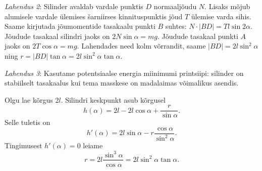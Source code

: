 \textit{Lahendus 2}: Silinder avaldab vardale punktis $D$ normaaljõudu $N$. Lisaks mõjub alumisele vardale ülemises šarniirses kinnituspunktis jõud $T$ ülemise varda sihis. Saame kirjutada jõumomentide tasakaalu punkti $B$ suhtes: $N \cdot |BD| =Tl\sin2\alpha$. Jõudude tasakaal silindri jaoks on $2N\sin\alpha=mg$. Jõudude tasakaal punkti $A$ jaoks on $2T\cos\alpha=mg$. Lahendades need kolm võrrandit, saame $|BD|=2l\sin^2\alpha$ ning $r=|BD|\tan\alpha=2l\sin^2\alpha \tan\alpha$.

\textit{Lahendus 3}: Kasutame potentsiaalse energia miinimumi printsiipi: silinder on stabiilselt tasakaalus kui tema masskese on madalaimas võimalikus asendis.

Olgu lae kõrgus $2l$. Silindri keskpunkt asub kõrgusel
\[
  h(\alpha)=2l-2l\cos\alpha + \frac{r}{\sin\alpha}.
\]
Selle tuletis on
\[
  h'(\alpha)=2l\sin\alpha - r\frac{\cos\alpha}{\sin^2\alpha}.
\]
Tingimusest $h'(\alpha)=0$ leiame
\[
  r=2l\frac{\sin^3\alpha}{\cos\alpha}=2l\sin^2\alpha \tan\alpha.
\]
\probend
